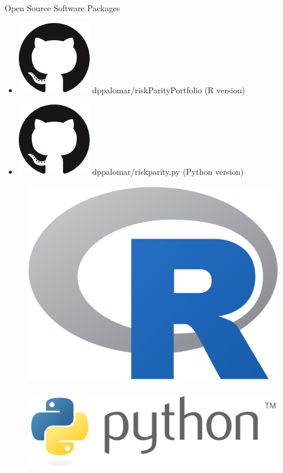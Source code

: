 \documentclass[aspectratio=169]{beamer}
\begin{document}
        \begin{frame}{Open Source Software Packages}
          \begin{itemize}
            \item[] \includegraphics[scale=.1]{images/github.png}  dppalomar/riskParityPortfolio (R version)
            \item[] \includegraphics[scale=.1]{images/github.png} dppalomar/riskparity.py (Python version)
          \end{itemize}
          \begin{figure}[!htb]
            \centering
            \includegraphics[scale=0.1]{images/r.png}~
            \includegraphics[scale=0.2]{images/python.png}
          \end{figure}
        \end{frame}
\end{document}
